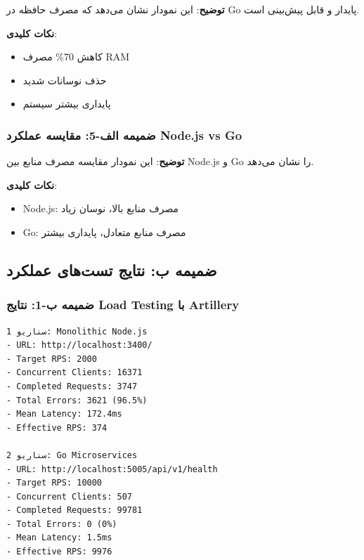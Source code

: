\documentclass[
]{article}
\providecommand{\tightlist}{%
  \setlength{\itemsep}{0pt}\setlength{\parskip}{0pt}}
\begin{document}
\textbf{توضیح}: این نمودار نشان می‌دهد که مصرف حافظه در Go پایدار و قابل
پیش‌بینی است.

\textbf{نکات کلیدی}:

\begin{itemize}
\tightlist
\item
  کاهش 70\% مصرف RAM
\item
  حذف نوسانات شدید
\item
  پایداری بیشتر سیستم
\end{itemize}

\subsubsection{ضمیمه الف-5: مقایسه عملکرد Node.js vs
Go}\label{ux636ux645ux6ccux645ux647-ux627ux644ux641-5-ux645ux642ux627ux6ccux633ux647-ux639ux645ux644ux6a9ux631ux62f-node.js-vs-go}

\textbf{توضیح}: این نمودار مقایسه مصرف منابع بین Node.js و Go را نشان
می‌دهد.

\textbf{نکات کلیدی}:

\begin{itemize}
\tightlist
\item
  Node.js: مصرف منابع بالا، نوسان زیاد
\item
  Go: مصرف منابع متعادل، پایداری بیشتر
\end{itemize}

\subsection{ضمیمه ب: نتایج تست‌های
عملکرد}\label{ux636ux645ux6ccux645ux647-ux628-ux646ux62aux627ux6ccux62c-ux62aux633ux62aux647ux627ux6cc-ux639ux645ux644ux6a9ux631ux62f}

\subsubsection{ضمیمه ب-1: نتایج Load Testing با
Artillery}\label{ux636ux645ux6ccux645ux647-ux628-1-ux646ux62aux627ux6ccux62c-load-testing-ux628ux627-artillery}

\begin{verbatim}
سناریو 1: Monolithic Node.js
- URL: http://localhost:3400/
- Target RPS: 2000
- Concurrent Clients: 16371
- Completed Requests: 3747
- Total Errors: 3621 (96.5%)
- Mean Latency: 172.4ms
- Effective RPS: 374

سناریو 2: Go Microservices
- URL: http://localhost:5005/api/v1/health
- Target RPS: 10000
- Concurrent Clients: 507
- Completed Requests: 99781
- Total Errors: 0 (0%)
- Mean Latency: 1.5ms
- Effective RPS: 9976
\end{verbatim}
\end{document}
